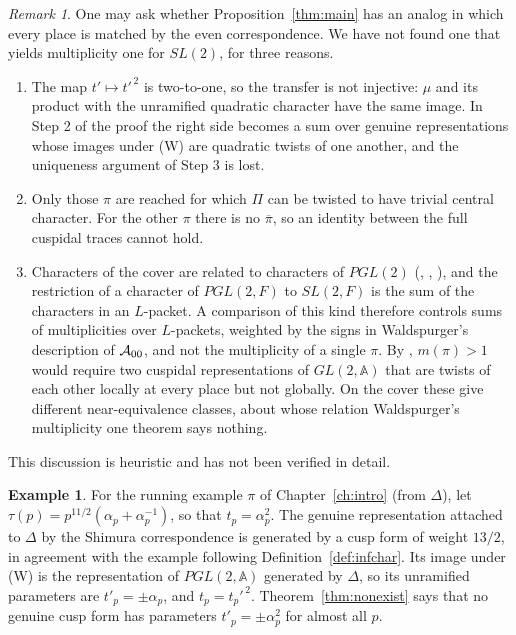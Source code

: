 \documentclass[12pt,letterpaper,openany]{book}
\theoremstyle{plain}
\theoremstyle{definition}
\newtheorem{example}[theorem]{Example}
\theoremstyle{remark}
\theoremstyle{remark}
\newtheorem{remyy}{Remark}
\begin{document}
\begin{remyy}
One may ask whether Proposition~\ref{thm:main} has an analog in which
every place is matched by the even correspondence. We have not found one
that yields multiplicity one for $SL(2)$, for three reasons.
\begin{enumerate}
\item The map $t'\mapsto t'^{\,2}$ is two-to-one, so the transfer is not
injective: $\mu$ and its product with the unramified quadratic character
have the same image. In Step 2 of the proof the right side becomes a sum
over genuine representations whose images under (W) are quadratic twists
of one another, and the uniqueness argument of Step 3 is lost.
\item Only those $\pi$ are reached for which $\Pi$ can be twisted to have
trivial central character. For the other $\pi$ there is no
$\overline\pi$, so an identity between the full cuspidal traces cannot
hold.
\item Characters of the cover are related to characters of $PGL(2)$
(\cite{Wa2}, \cite{Ad2}, \cite{Li19}), and the restriction of a character
of $PGL(2,F)$ to $SL(2,F)$ is the sum of the characters in an $L$-packet.
A comparison of this kind therefore controls sums of multiplicities over
$L$-packets, weighted by the signs in Waldspurger's description of
${\cal A}_{00}$, and not the multiplicity of a single $\pi$. By
\cite{LL}, $m(\pi)>1$ would require two cuspidal representations of
$GL(2,{\mathbb A})$ that are twists of each other locally at every place
but not globally. On the cover these give different near-equivalence
classes, about whose relation Waldspurger's multiplicity one theorem says
nothing.
\end{enumerate}
This discussion is heuristic and has not been verified in detail.
\end{remyy}

\begin{example}
For the running example $\pi$ of Chapter~\ref{ch:intro} (from $\Delta$),
let $\tau(p)=p^{11/2}(\alpha_p+\alpha_p^{-1})$, so that $t_p=\alpha_p^2$.
The genuine representation attached to $\Delta$ by the Shimura
correspondence is generated by a cusp form of weight $13/2$, in agreement
with the example following Definition~\ref{def:infchar}. Its image under
(W) is the representation of $PGL(2,{\mathbb A})$ generated by $\Delta$,
so its unramified parameters are $t'_p=\pm\alpha_p$, and
$t_p=t_p'^{\,2}$. Theorem~\ref{thm:nonexist} says that no genuine cusp
form has parameters $t'_p=\pm\alpha_p^2$ for almost all $p$.
\end{example}
\end{document}
